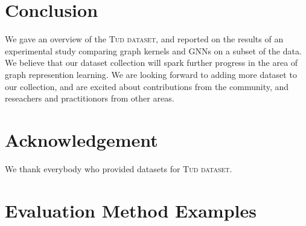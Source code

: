 \documentclass{article}
\theoremstyle{definition}
\begin{document}
\begin{table}[t]\centering		
	\caption{Results for neural and kernel baselines.}
	\label{t2l}	
\end{table}		



\section{Conclusion}

We gave an overview of the \textsc{Tud dataset}, and reported on the results of an experimental study comparing graph kernels and GNNs on a subset of the data. We believe that our dataset collection will spark further progress in the area of graph represention learning. We are looking forward to adding more dataset to our collection, and are excited about contributions from the community, and reseachers and practitionors from other areas.


\section{Acknowledgement}

We thank everybody who provided datasets for \textsc{Tud dataset}.




\appendix

\onecolumn
\section{Evaluation Method Examples}

\end{document}
